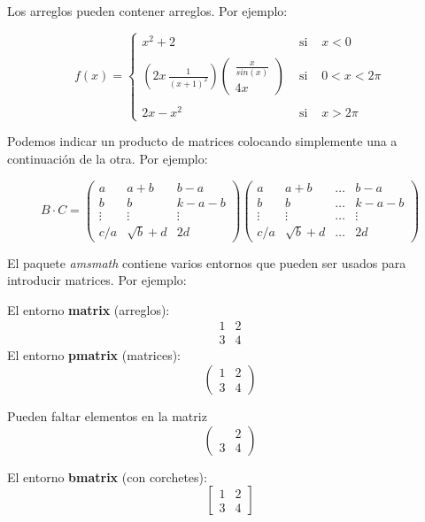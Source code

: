 \documentclass[letterpaper,12pt]{book}
\begin{document}
Los arreglos pueden contener arreglos. Por ejemplo:

\[
f(x)= \left\{ 
\begin{array}{lcl}
	x^2 + 2 & \mbox{ si } & x<0 \\
	& & \\
	(2x \, \frac{1}{(x+1)^2})\left(\begin{array}{c} \frac{x}{sin(x)} \\ 4x \end{array}\right) & \mbox{ si } 
	& 0 < x < 2 \pi \\
	& & \\
	2 x - x^2 & \mbox{ si } & x>2 \pi
\end{array}
\right.
\]

Podemos indicar un producto de matrices colocando simplemente una a continuación de la otra. Por ejemplo:

\[
B \cdot C = \left( 
\begin{array}{lcc}
	a & a+b & b-a \\
	b & b & k-a-b \\
	\vdots & \vdots & \vdots \\
	c/a & \sqrt{b} + d & 2d
\end{array}
\right)\left( 
\begin{array}{lccc}
	a & a+b & \hdots & b-a \\
	b & b & \hdots & k-a-b \\
	\vdots & \vdots & \hdots & \vdots \\
	c/a & \sqrt{b} + d & \hdots & 2d
\end{array}
\right)
\]

El paquete \emph{amsmath} contiene varios entornos que pueden ser usados para introducir matrices. Por ejemplo:

El entorno \textbf{matrix} (arreglos):
\[
\begin{matrix}
	1 & 2 \\
	3 & 4
\end{matrix}
\]
El entorno \textbf{pmatrix} (matrices):
\[
\begin{pmatrix}
	1 & 2 \\
	3 & 4
\end{pmatrix}
\]

Pueden faltar elementos en la matriz
\[
\begin{pmatrix}
	 & 2 \\
	3 & 4
\end{pmatrix}
\] 

El entorno \textbf{bmatrix} (con corchetes):
\[
\begin{bmatrix}
	1 & 2 \\
	3 & 4
\end{bmatrix}
\]
\end{document}
